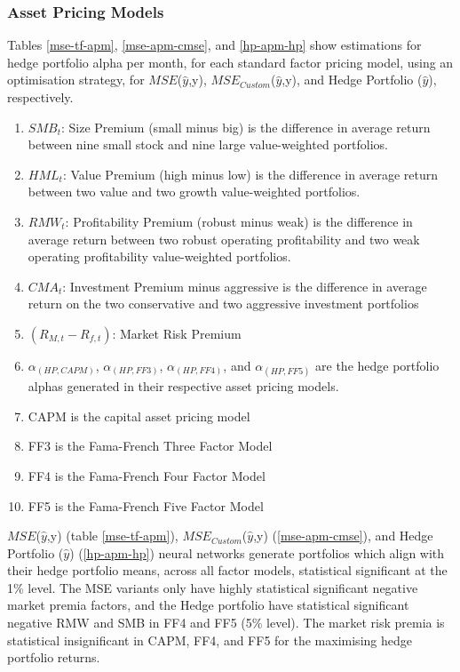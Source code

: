 \documentclass[12pt]{article}
\begin{document}
\subsubsection{Asset Pricing Models}
Tables \ref{mse-tf-apm}, \ref{mse-apm-cmse}, and \ref{hp-apm-hp} show estimations for hedge portfolio alpha per month, for each standard factor pricing model, using an optimisation strategy,
for $MSE$($\hat{y}$,y), $MSE_{Custom}$($\hat{y}$,y), and Hedge Portfolio ($\hat{y}$), respectively.
\singlespacing
\begin{enumerate}
	\item $SMB_{t}$: Size Premium (small minus big) is the difference in average return between nine small stock and nine large value-weighted portfolios.
	\item $HML_{t}$: Value Premium (high minus low) is the difference in average return between two value and two growth value-weighted portfolios.
	\item $RMW_{t}$: Profitability Premium (robust minus weak) is the difference in average return between two robust operating profitability and two weak operating profitability value-weighted portfolios.
	\item $CMA_{t}$: Investment Premium minus aggressive is the difference in average return on the two conservative and two aggressive investment portfolios
	\item $(R_{M,t}-R_{f,t})$: Market Risk Premium
	\item $\alpha_{(HP,CAPM)}$, $\alpha_{(HP,FF3)}$, $\alpha_{(HP,FF4)}$, and $\alpha_{(HP,FF5)}$ are the hedge portfolio alphas generated in their respective asset pricing models.
	\item CAPM is the capital asset pricing model
	\item FF3 is the Fama-French Three Factor Model
	\item FF4 is the Fama-French Four Factor Model
	\item FF5 is the Fama-French Five Factor Model
\end{enumerate}
\doublespacing
$MSE$($\hat{y}$,y) (table \ref{mse-tf-apm}), $MSE_{Custom}$($\hat{y}$,y) (\ref{mse-apm-cmse}), and Hedge Portfolio ($\hat{y}$) (\ref{hp-apm-hp}) neural networks generate portfolios which align with their hedge portfolio means, across all factor models, statistical significant at the 1\% level.
The MSE variants only have highly statistical significant negative market premia factors, and the Hedge portfolio have statistical significant negative RMW and SMB in FF4 and FF5 (5\% level).
The market risk premia is statistical insignificant in CAPM, FF4, and FF5 for the maximising hedge portfolio returns.
\end{document}
